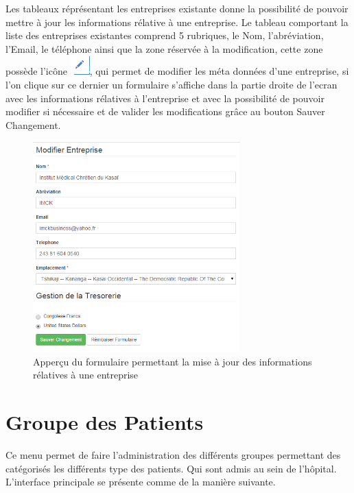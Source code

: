 \documentclass[12pt,a4paper]{report}
\begin{document}
Les tableaux réprésentant les entreprises existante donne la possibilité de pouvoir mettre à jour les informations rélative à une entreprise. Le tableau comportant la liste des entreprises existantes comprend 5 rubriques, le Nom, l'abréviation, l'Email, le téléphone ainsi que la zone réservée à la modification, cette zone possède l'icône \includegraphics[scale=0.7]{pic/EditUser.png}, qui permet de modifier les méta données d'une entreprise, si l'on clique sur ce dernier un formulaire s'affiche dans la partie droite de l'ecran avec les informations rélatives à l'entreprise et avec la possibilité de pouvoir modifier si nécessaire et de valider les modifications grâce au bouton Sauver Changement.
\begin{figure}[h]
\begin{center}
\includegraphics[width=8cm]{pic/ModEntreprise.png}
\end{center}
\caption{Apperçu du formulaire permettant la mise à jour des informations rélatives à une entreprise}
\label{Apperçu du formulaire permettant la mise à jour des informations rélatives à une entreprise}
\end{figure} 

\newpage
\section{Groupe des Patients}
Ce menu permet de faire l'administration des différents groupes permettant des catégorisés les différents type des patients. Qui sont admis au sein de l'hôpital. L'interface principale se présente comme de la manière suivante.
\end{document}
